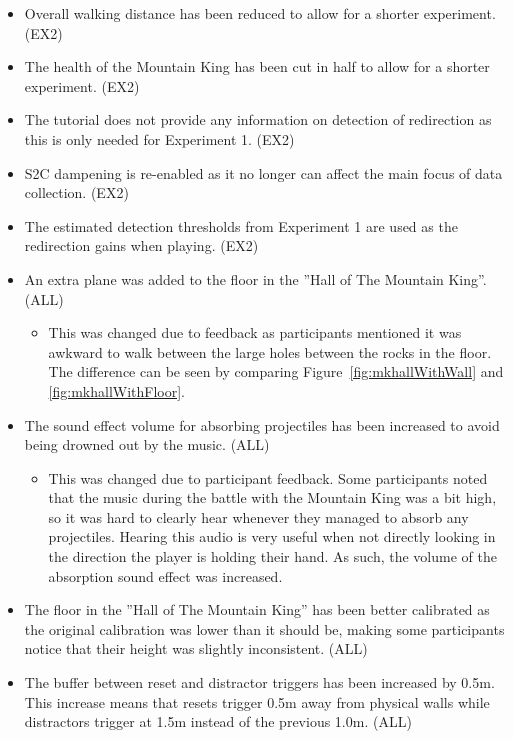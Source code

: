\begin{itemize}
    \item Overall walking distance has been reduced to allow for a shorter experiment. (EX2)
    \item The health of the Mountain King has been cut in half to allow for a shorter experiment. (EX2)
    \item The tutorial does not provide any information on detection of redirection as this is only needed for Experiment 1. (EX2)
    \item S2C dampening is re-enabled as it no longer can affect the main focus of data collection. (EX2)
    \item The estimated detection thresholds from Experiment 1 are used as the redirection gains when playing. (EX2)
    \item An extra plane was added to the floor in the ''Hall of The Mountain King''. (ALL)
    \begin{itemize}
        \item This was changed due to feedback as participants mentioned it was awkward to walk between the large holes between the rocks in the floor. The difference can be seen by comparing Figure~\ref{fig:mkhallWithWall} and \ref{fig:mkhallWithFloor}.
    \end{itemize}
    \item The sound effect volume for absorbing projectiles has been increased to avoid being drowned out by the music. (ALL)
    \begin{itemize}
        \item This was changed due to participant feedback. Some participants noted that the music during the battle with the Mountain King was a bit high, so it was hard to clearly hear whenever they managed to absorb any projectiles. Hearing this audio is very useful when not directly looking in the direction the player is holding their hand. As such, the volume of the absorption sound effect was increased.
    \end{itemize}
    \item The floor in the ''Hall of The Mountain King'' has been better calibrated as the original calibration was lower than it should be, making some participants notice that their height was slightly inconsistent. (ALL)
    \item The buffer between reset and distractor triggers has been increased by 0.5m. This increase means that resets trigger 0.5m away from physical walls while distractors trigger at 1.5m instead of the previous 1.0m. (ALL)

\end{itemize}
